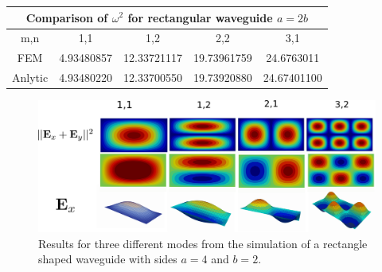 \begin{center}
\begin{tabular}{|c|c|c|c|c|}
\hline
\multicolumn{5}{|c|}{Comparison of $\omega^2$ for rectangular waveguide $a =2b$} \\
\hline 
m,n & 1,1 & 1,2 & 2,2 & 3,1 \\ 
\hline 
FEM & 4.93480857 & 12.33721117 & 19.73961759 & 24.6763011 \\ 
\hline 
Anlytic & 4.93480220 & 12.33700550 & 19.73920880 & 24.67401100 \\ 
\hline 
\end{tabular} 
\label{tab:sq_wav_comparison}
\end{center}
\begin{figure}
\centering
\includegraphics[scale=0.07]{./img/rectangular_waveguide.pdf}
\caption{Results for three different modes from the simulation of a rectangle shaped waveguide with sides $a=4$ and $b=2$.}
\label{fig:square_waveguide}
\end{figure}

